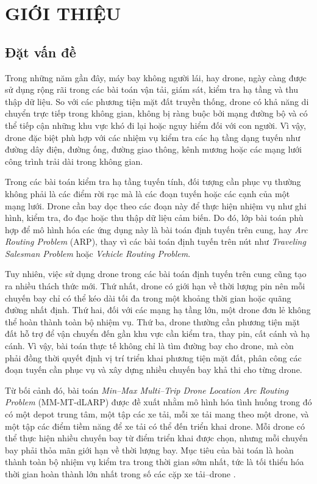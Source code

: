 \chapter{GIỚI THIỆU}
\label{chap:gioi-thieu}

\section{Đặt vấn đề}

Trong những năm gần đây, máy bay không người lái, hay drone, ngày càng được sử dụng rộng rãi trong các bài toán vận tải, giám sát, kiểm tra hạ tầng và thu thập dữ liệu. So với các phương tiện mặt đất truyền thống, drone có khả năng di chuyển trực tiếp trong không gian, không bị ràng buộc bởi mạng đường bộ và có thể tiếp cận những khu vực khó đi lại hoặc nguy hiểm đối với con người. Vì vậy, drone đặc biệt phù hợp với các nhiệm vụ kiểm tra các hạ tầng dạng tuyến như đường dây điện, đường ống, đường giao thông, kênh mương hoặc các mạng lưới công trình trải dài trong không gian.

Trong các bài toán kiểm tra hạ tầng tuyến tính, đối tượng cần phục vụ thường không phải là các điểm rời rạc mà là các đoạn tuyến hoặc các cạnh của một mạng lưới. Drone cần bay dọc theo các đoạn này để thực hiện nhiệm vụ như ghi hình, kiểm tra, đo đạc hoặc thu thập dữ liệu cảm biến. Do đó, lớp bài toán phù hợp để mô hình hóa các ứng dụng này là bài toán định tuyến trên cung, hay \textit{Arc Routing Problem} (ARP), thay vì các bài toán định tuyến trên nút như \textit{Traveling Salesman Problem} hoặc \textit{Vehicle Routing Problem}.

Tuy nhiên, việc sử dụng drone trong các bài toán định tuyến trên cung cũng tạo ra nhiều thách thức mới. Thứ nhất, drone có giới hạn về thời lượng pin nên mỗi chuyến bay chỉ có thể kéo dài tối đa trong một khoảng thời gian hoặc quãng đường nhất định. Thứ hai, đối với các mạng hạ tầng lớn, một drone đơn lẻ không thể hoàn thành toàn bộ nhiệm vụ. Thứ ba, drone thường cần phương tiện mặt đất hỗ trợ để vận chuyển đến gần khu vực cần kiểm tra, thay pin, cất cánh và hạ cánh. Vì vậy, bài toán thực tế không chỉ là tìm đường bay cho drone, mà còn phải đồng thời quyết định vị trí triển khai phương tiện mặt đất, phân công các đoạn tuyến cần phục vụ và xây dựng nhiều chuyến bay khả thi cho từng drone.

Từ bối cảnh đó, bài toán \textit{Min--Max Multi--Trip Drone Location Arc Routing Problem} (MM-MT-dLARP) được đề xuất nhằm mô hình hóa tình huống trong đó có một depot trung tâm, một tập các xe tải, mỗi xe tải mang theo một drone, và một tập các điểm tiềm năng để xe tải có thể đến triển khai drone. Mỗi drone có thể thực hiện nhiều chuyến bay từ điểm triển khai được chọn, nhưng mỗi chuyến bay phải thỏa mãn giới hạn về thời lượng bay. Mục tiêu của bài toán là hoàn thành toàn bộ nhiệm vụ kiểm tra trong thời gian sớm nhất, tức là tối thiểu hóa thời gian hoàn thành lớn nhất trong số các cặp xe tải--drone \cite{corberan2025mmdlarp}.

